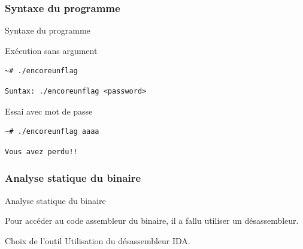 \documentclass[10pt,sans,usenames,dvipsnames,french,compress]{beamer}
\begin{document}
\subsubsection{Syntaxe du programme}
\begin{frame}[fragile]{Syntaxe du programme}
	\begin{block}{Exécution sans argument}
		\vspace{-3mm}
		\begin{lstlisting}[style=Term]
			~# ./encoreunflag
		\end{lstlisting}
		\vspace{-2mm}
	\end{block}

	\begin{block}{}
		\vspace{-3mm}
		\begin{lstlisting}[style=Term]
			Suntax: ./encoreunflag <password>
		\end{lstlisting}
		\vspace{-2mm}
	\end{block}

	\begin{block}{Essai avec mot de passe}
		\vspace{-3mm}
		\begin{lstlisting}[style=Term]
			~# ./encoreunflag aaaa
		\end{lstlisting}
		\vspace{-2mm}
	\end{block}

	\begin{block}{}
		\vspace{-3mm}
		\begin{lstlisting}[style=Term]
			Vous avez perdu!!
		\end{lstlisting}
		\vspace{-2mm}
	\end{block}
\end{frame}

\subsubsection{Analyse statique du binaire}
\begin{frame}[fragile]{Analyse statique du binaire}
	\begin{block}{}
		Pour accéder au code assembleur du binaire, il a fallu utiliser un désassembleur.
	\end{block}

	\begin{exampleblock}{Choix de l'outil}
		Utilisation du désassembleur IDA.
	\end{exampleblock}
\end{frame}
\end{document}
